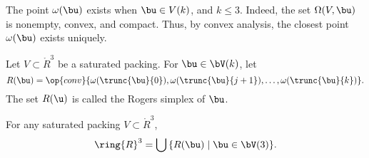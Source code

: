 The point $\omega(\bu)$ exists when $\bu\in V(k)$, and $k\le 3$.
Indeed, the set $\Omega(V, \bu)$ is nonempty, convex, and compact.  Thus, by
convex analysis, the closest point $\omega( \bu)$ exists uniquely.
%

\begin{definition} 
Let $V\subset\ring{R}^3$ be a saturated packing. For $\bu\in \bV(k)$, let 
\begin{displaymath} 
R(\bu) = \op{conv}\{\omega( \trunc{\bu}{0}), \omega(
\trunc{\bu}{j+1}),\ldots,\omega( \trunc{\bu}{k})\}.
\end{displaymath}
The set $R(\u)$ is called the Rogers simplex of $\bu$.
%
\end{definition}

\begin{lemma}[] 
For any saturated packing $V\subset\ring{R}^3$, 
\begin{displaymath}\ring{R}^3 = \bigcup\, \{ R(\bu) \mid \bu\in
\bV(3)\}.\end{displaymath}
\end{lemma}

